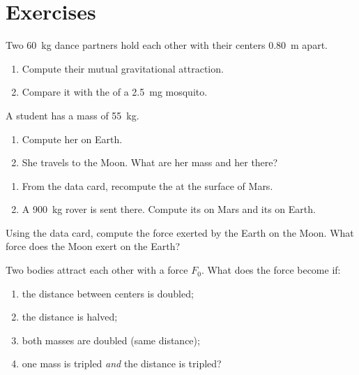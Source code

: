 \section{Exercises}

\begin{exercise}[$\star$]\label{exo:g10:universal-gravitation:1}
Two \qty{60}{kg} dance partners hold each other with their centers
\qty{0.80}{m} apart.
\begin{enumerate}
  \item Compute their mutual gravitational attraction.
  \item Compare it with the  of a \qty{2.5}{mg} mosquito.
\end{enumerate}
\end{exercise}

\begin{exercise}[$\star$]\label{exo:g10:universal-gravitation:2}
A student has a mass of \qty{55}{kg}.
\begin{enumerate}
  \item Compute her  on Earth.
  \item She travels to the Moon. What are her mass and her 
        there?
\end{enumerate}
\end{exercise}

\begin{exercise}[$\star$]\label{exo:g10:universal-gravitation:3}
\begin{enumerate}
  \item From the data card, recompute the 
        at the surface of Mars.
  \item A \qty{900}{kg} rover is sent there. Compute its  on Mars
        and its  on Earth.
\end{enumerate}
\end{exercise}

\begin{exercise}[$\star$]\label{exo:g10:universal-gravitation:4}
Using the data card, compute the force exerted by the Earth on the
Moon. What force does the Moon exert on the Earth?
\end{exercise}

\begin{exercise}[$\star$]\label{exo:g10:universal-gravitation:5}
Two bodies attract each other with a force $F_0$. What does the force
become if:
\begin{enumerate}
  \item the distance between centers is doubled;
  \item the distance is halved;
  \item both masses are doubled (same distance);
  \item one mass is tripled \emph{and} the distance is tripled?
\end{enumerate}
\end{exercise}

